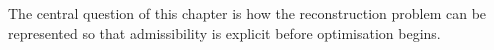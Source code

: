 The central question of this chapter is how the reconstruction problem can be represented so that admissibility is explicit before optimisation begins.
